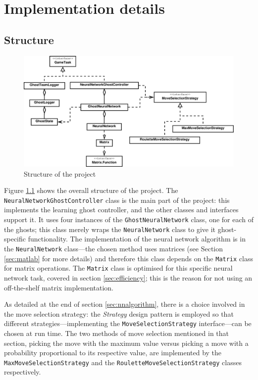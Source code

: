 \chapter{Implementation details}
\label{ch:implementation}

\section{Structure}
\label{sec:structure}

\begin{figure}
\includegraphics[width=\linewidth]{diagrams/project2}
\caption{Structure of the project}
\label{fig:project}
\end{figure}

Figure \ref{fig:project} shows the overall structure of the project.  The {\tt NeuralNetworkGhostController} class is the main part of the project: this implements the learning ghost controller, and the other classes and interfaces support it.  It uses four instances of the {\tt GhostNeuralNetwork} class, one for each of the ghosts; this class merely wraps the {\tt NeuralNetwork} class to give it ghost-specific functionality.  The implementation of the neural network algorithm is in the {\tt NeuralNetwork} class---the chosen method uses matrices (see Section \ref{sec:matlab} for more details) and therefore this class depends on the {\tt Matrix} class for matrix operations.  The {\tt Matrix} class is optimised for this specific neural network task, covered in section \ref{sec:efficiency}; this is the reason for not using an off-the-shelf matrix implementation.

As detailed at the end of section \ref{sec:nnalgorithm}, there is a choice involved in the move selection strategy: the \emph{Strategy} design pattern is employed so that different strategies---implementing the {\tt MoveSelectionStrategy} interface---can be chosen at run time.  The two methods of move selection mentioned in that section, picking the move with the maximum value versus picking a move with a probability proportional to its respective value, are implemented by the {\tt MaxMoveSelectionStrategy} and the {\tt RouletteMoveSelectionStrategy} classes respectively.

